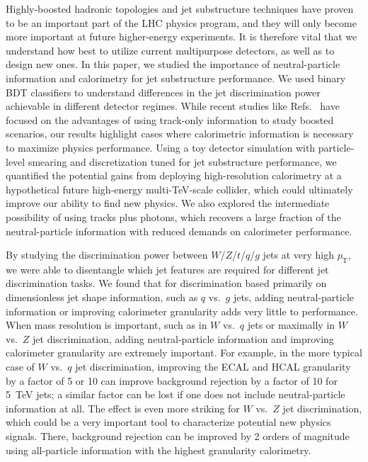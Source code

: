 \documentclass[11pt,letterpaper]{article}
\DeclareRobustCommand{\Refs}[1]{Refs.~\cite{#1}}
\newcommand{\pt}{p_{\mathrm{T}}}
\begin{document}
Highly-boosted hadronic topologies and jet substructure techniques have proven to be an important part of the LHC physics program, and they will only become more important at future higher-energy experiments.
%
It is therefore vital that we understand how best to utilize current multipurpose detectors, as well as to design new ones.
%  
In this paper, we studied the importance of neutral-particle information and calorimetry for jet substructure performance.
%
We used binary BDT classifiers to understand differences in the jet discrimination power achievable in different detector regimes.
%
While recent studies like \Refs{Larkoski:2015yqa,Spannowsky:2015eba,Bressler:2015uma} have focused on the advantages of using track-only information to study boosted scenarios, our results highlight cases where calorimetric information is necessary to maximize physics performance.
%
Using a toy detector simulation with particle-level smearing and discretization tuned for jet substructure performance, we quantified the potential gains from deploying high-resolution calorimetry at a hypothetical future high-energy multi-TeV-scale collider, which could ultimately improve our ability to find new physics.
%
We also explored the intermediate possibility of using tracks plus photons, which recovers a large fraction of the neutral-particle information with reduced demands on calorimeter performance.

By studying the discrimination power between $W$/$Z$/$t$/$q$/$g$ jets at very high $\pt$, we were able to disentangle which jet features are required for different jet discrimination tasks.
%
We found that for discrimination based primarily on dimensionless jet shape information, such as $q$ vs.\ $g$ jets, adding neutral-particle information or improving calorimeter granularity adds very little to performance.
%
When mass resolution is important, such as in $W$ vs.\ $q$ jets or maximally in $W$ vs.\ $Z$ jet discrimination, adding neutral-particle information and improving calorimeter granularity are extremely important. 
%
For example, in the more typical case of $W$ vs.\ $q$ jet discrimination, improving the ECAL and HCAL granularity by a factor of 5 or 10 can improve background rejection by a factor of 10 for 5~TeV jets; a similar factor can be lost if one does not include neutral-particle information at all. 
% 
The effect is even more striking for $W$ vs.\ $Z$ jet discrimination, which could be a very important tool to characterize potential new physics signals.
%
There, background rejection can be improved by 2 orders of magnitude using all-particle information with the highest granularity calorimetry.
\end{document}
